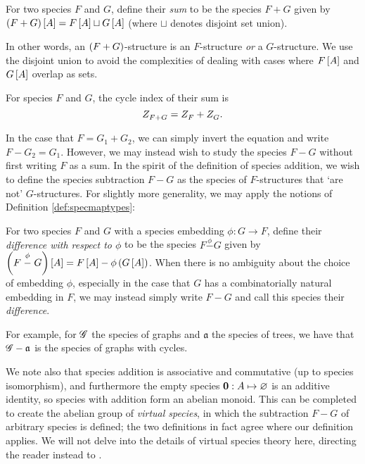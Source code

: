 \documentclass[distribution,draft]{brandiss} %
\numberwithin{section}{chapter}
\numberwithin{figure}{chapter}
\begin{document}
\begin{definition}\label{def:specsum}
  For two species $F$ and $G$, define their \emph{sum} to be the species $F + G$ given by $\left( {F + G} \right) \left[ {A} \right] = F \left[ {A} \right] \sqcup G \left[ {A} \right]$ (where $\sqcup$ denotes disjoint set union).
\end{definition}
In other words, an $\left( {F + G} \right)$-structure is an $F$-structure \emph{or} a $G$-structure.
We use the disjoint union to avoid the complexities of dealing with cases where $F \left[ {A} \right]$ and $G \left[ {A} \right]$ overlap as sets.

\begin{theorem}\label{thm:specsumci}
  For species $F$ and $G$, the cycle index of their sum is
  \begin{equation}
    \label{eq:specsumci}
     Z_{F + G}^{}  =  Z_{F}^{}  +  Z_{G}^{} .
  \end{equation}
\end{theorem}

In the case that $F = G_{1} + G_{2}$, we can simply invert the equation and write $F - G_{2} = G_{1}$.
However, we may instead wish to study the species $F - G$ without first writing $F$ as a sum.
In the spirit of the definition of species addition, we wish to define the species subtraction $F - G$ as the species of $F$-structures that `are not' $G$-structures.
For slightly more generality, we may apply the notions of Definition \ref{def:specmaptypes}:
\begin{definition}
  \label{def:specdif}
  For two species $F$ and $G$ with a species embedding $\phi: G \to F$, define their \emph{difference with respect to $\phi$} to be the species $F \stackrel{\phi}{-} G$ given by $\left( {F \stackrel{\phi}{-} G} \right) \left[ {A} \right] = F \left[ {A} \right] - \phi \left( {G \left[ {A} \right]} \right)$.
  When there is no ambiguity about the choice of embedding $\phi$, especially in the case that $G$ has a combinatorially natural embedding in $F$, we may instead simply write $F - G$ and call this species their \emph{difference}.
\end{definition}

For example, for $\mathscr{G}$ the species of graphs and $\mathfrak{a}$ the species of trees, we have that $\mathscr{G} - \mathfrak{a}$ is the species of graphs with cycles.

We note also that species addition is associative and commutative (up to species isomorphism), and furthermore the empty species $\mathbf{0}: A \mapsto \varnothing$ is an additive identity, so species with addition form an abelian monoid.
This can be completed to create the abelian group of \emph{virtual species}, in which the subtraction $F - G$ of arbitrary species is defined; the two definitions in fact agree where our definition applies.
We will not delve into the details of virtual species theory here, directing the reader instead to \cite[\S 2.5]{bll:species}.
\end{document}
